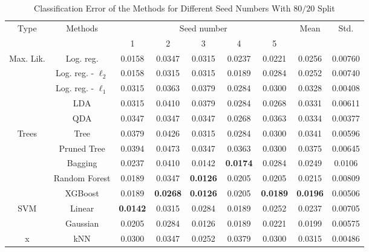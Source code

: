 \begin{table}[htb]
	\caption{Classification Error of the Methods for Different Seed Numbers With $80/20$ Split}
	\begin{center}
		\begin{tabular}{@{} c c c  c c c c c c @{}}\toprule
			\multirow{2}{*}{Type} & \multirow{2}{*}{Methods} &  \multicolumn{5}{c}{Seed number}
			& 	\multirow{2}{*}{Mean} & \multirow{2}{*}{Std.} \\
			& & 1 & 2 & 3 & 4 & 5 & & \\
			\midrule
			\multirow{5}{*}{Max. Lik.} & Log. reg. & \num{0.0158} & \num{0.0347} & \num{0.0315} & \num{0.0237} & \num{0.0221} & \num{0.0256} & \num{0.00760} \\
			& Log. reg. - $\ell_2$ & \num{0.0158} & \num{0.0315} & \num{0.0315} & \num{0.0189} & \num{0.0284} & \num{0.0252} & \num{0.00740}\\
			& Log. reg. - $\ell_1$ & \num{0.0315} & \num{0.0363} & \num{0.0379} & \num{0.0284} & \num{0.0300} & \num{0.0328} & \num{0.00408}\\
			& LDA & \num{0.0315} & \num{0.0410} & \num{0.0379} & \num{0.0284} & \num{0.0268} & \num{0.0331} & \num{0.00611}\\
			& QDA & \num{0.0347} & \num{0.0347} & \num{0.0347} & \num{0.0268} & \num{0.0363} & \num{0.0334} & \num{0.00377}\\
			\cmidrule{1-9}
			\multirow{5}{*}{Trees} & Tree & \num{0.0379} & \num{0.0426} & \num{0.0315} & \num{0.0284} & \num{0.0300} &  \num{0.0341} & \num{0.00596}\\
			& Pruned Tree & \num{0.0394} & \num{0.0473} & \num{0.0347} & \num{0.0363} & \num{0.0300} & \num{0.0375} & \num{0.00645}\\  
			& Bagging & \num{0.0237} & \num{0.0410} & \num{0.0142} & \textbf{\num{0.0174}} & \num{0.0284} & \num{0.0249} & \num{0.0106}\\
			& Random Forest & \num{0.0189} & \num{0.0347} & \textbf{\num{0.0126}} & \num{0.0205} & \num{0.0205} & \num{0.0215}  & \num{0.00809}\\
			& XGBoost & \num{0.0189} & \textbf{\num{0.0268}} & \textbf{\num{0.0126}} & \num{0.0205} & \textbf{\num{0.0189}} & \textbf{\num{0.0196}}  & \num{0.00506}\\
			\cmidrule{1-9}
			\multirow{2}{*}{SVM} & Linear & \textbf{\num{0.0142}} & \num{0.0315} & \num{0.0284} & \num{0.0189} & \num{0.0252} & \num{0.0237}  & \num{0.00705}\\
			& Gaussian & \num{0.0205} & \num{0.0284} & \num{0.0126} & \num{0.0189} & \num{0.0221} & \num{0.0199} & \num{0.00575}\\
			\cmidrule{1-9}
			x & kNN & \num{0.0300} & \num{0.0347} & \num{0.0252} & \num{0.0379} & \num{0.0300}& \num{0.0315}  & \num{0.00486} \\
			\bottomrule
			\end{tabular}
			\end{center}
			\label{tab_res_naive}
\end{table}

